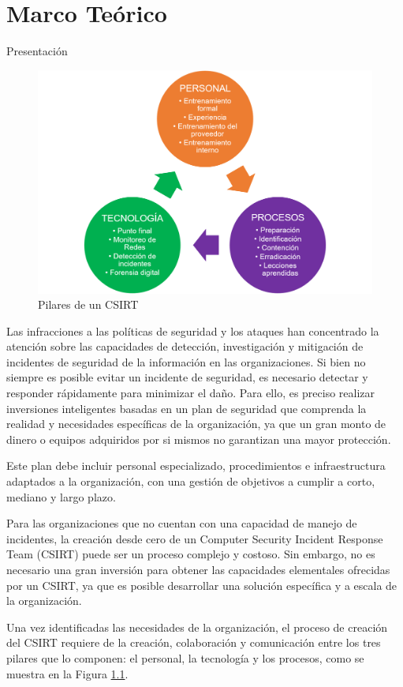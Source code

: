 \chapter{Marco Teórico}
    \begin{section}{Presentación}
    
        \begin{figure}[H]
            \centering
            \includegraphics[width=1\textwidth]{./marco_teorico_imagenes/figura_1_pilares.png}
            \caption{Pilares de un CSIRT}
            \label{fig:pilares}
        \end{figure}
        Las infracciones a las políticas de seguridad y los ataques han concentrado la atención sobre las capacidades de detección, investigación y mitigación de incidentes de seguridad de la información en  las organizaciones. Si bien no siempre es posible evitar un incidente de seguridad, es necesario detectar y responder rápidamente para minimizar el daño. Para ello, es preciso realizar inversiones inteligentes basadas en un plan de seguridad que comprenda la realidad y necesidades específicas de la organización, ya que un gran monto de dinero o equipos adquiridos por si mismos no garantizan una mayor protección. \par
        Este plan debe incluir personal especializado, procedimientos e infraestructura  adaptados a la organización, con una gestión de objetivos a cumplir a corto, mediano y largo plazo. \par
        Para las organizaciones que no cuentan con una capacidad de manejo de incidentes, la creación desde cero de un Computer Security Incident Response Team (CSIRT) puede ser un proceso complejo y costoso. Sin embargo, no es necesario una gran inversión para obtener las capacidades elementales ofrecidas por un CSIRT, ya que es posible desarrollar una solución específica y a escala de la organización. \par
        Una vez identificadas las necesidades de la organización, el proceso de creación del CSIRT requiere de la creación, colaboración y comunicación entre los tres pilares que lo componen: el personal, la tecnología y los procesos, como se muestra en la Figura \ref{fig:pilares}. \par
        

\end{section}
